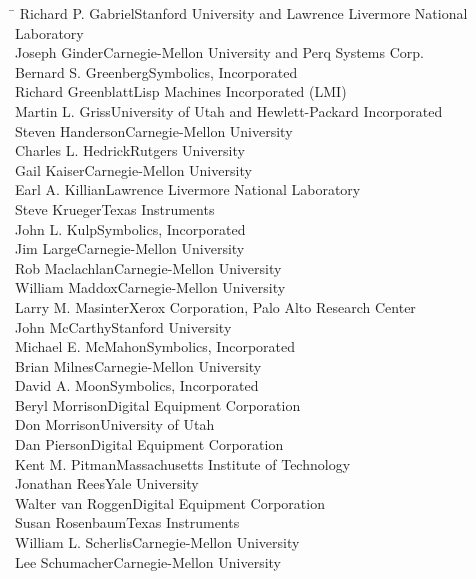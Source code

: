 \begin{tabbing}
\hskip8.5pc\=\kill
Richard P. Gabriel\>Stanford University and Lawrence Livermore National \\
                  \>Laboratory \\
Joseph Ginder\>Carnegie-Mellon University and Perq Systems Corp. \\
Bernard S. Greenberg\>Symbolics, Incorporated \\
Richard Greenblatt\>Lisp Machines Incorporated (LMI) \\
Martin L. Griss\>University of Utah and Hewlett-Packard Incorporated \\
Steven Handerson\>Carnegie-Mellon University \\
Charles L. Hedrick\>Rutgers University \\
Gail Kaiser\>Carnegie-Mellon University \\
Earl A. Killian\>Lawrence Livermore National Laboratory \\
Steve Krueger\>Texas Instruments \\
John L. Kulp\>Symbolics, Incorporated \\
Jim Large\>Carnegie-Mellon University \\
Rob Maclachlan\>Carnegie-Mellon University \\
William Maddox\>Carnegie-Mellon University \\
Larry M. Masinter\>Xerox Corporation, Palo Alto Research Center \\
John McCarthy\>Stanford University \\
Michael E. McMahon\>Symbolics, Incorporated \\
Brian Milnes\>Carnegie-Mellon University \\
David A. Moon\>Symbolics, Incorporated \\
Beryl Morrison\>Digital Equipment Corporation \\
Don Morrison\>University of Utah \\
Dan Pierson\>Digital Equipment Corporation \\
Kent M. Pitman\>Massachusetts Institute of Technology \\
Jonathan Rees\>Yale University \\
Walter van Roggen\>Digital Equipment Corporation \\
Susan Rosenbaum\>Texas Instruments \\
William L. Scherlis\>Carnegie-Mellon University \\
Lee Schumacher\>Carnegie-Mellon University \\

\end{tabbing}
